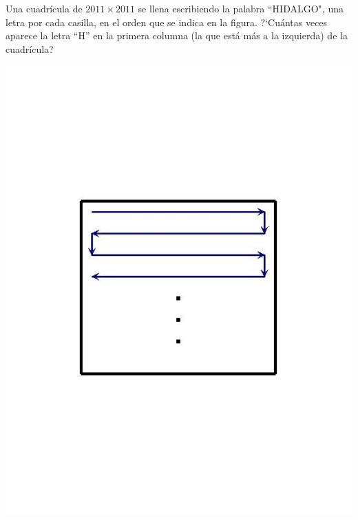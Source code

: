 \begin{Solucion}
  
\end{Solucion}

\begin{Problema}{13}
  Una cuadr\'icula de $2011 \times 2011$ se llena escribiendo la
  palabra ``HIDALGO", una letra por cada casilla, en el orden que se
  indica en la figura. ?`Cu\'antas veces aparece la letra ``H'' en la
  primera columna (la que est\'a m\'as a la izquierda) de la
  cuadr\'icula?

  \begin{center}
    \includegraphics[scale=0.5,viewport=114 222 498 570]{direcciones.pdf}
  \end{center}
\end{Problema}

\begin{Solucion}
  
\end{Solucion}



